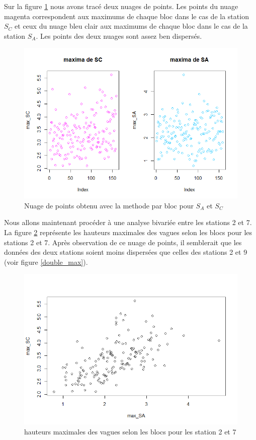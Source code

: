 \documentclass[a4paper,french,10pt]{article}
\begin{document}
Sur la figure \ref{max_SA_SC} nous avons tracé deux nuages de points. Les points du nuage magenta correspondent aux maximums de chaque bloc dans le cas de la station $S_C$ et ceux du nuage bleu clair aux maximums de chaque bloc dans le cas de la station $S_A$. Les points des deux nuages sont assez ben dispersés.
\begin{figure}[htp] 
	\centering
	\includegraphics[scale=0.45]{images/max_SA_SC.png}
	\caption{Nuage de points obtenu avec la methode par bloc pour $S_A$ et $S_C$}
	\label{max_SA_SC}
\end{figure}

Nous allons maintenant procéder à une analyse bivariée entre les stations 2 et 7. La figure \ref{double_max2} représente les hauteurs maximales des vagues selon les blocs pour les stations 2 et 7. Après observation de ce nuage de points, il semblerait que les données des deux stations soient moins dispersées que celles des stations 2 et 9 (voir figure \ref{double_max}).

\begin{figure}[htp] 
	\centering
	\includegraphics[scale=0.45]{images/double_max2.png}
	\caption{hauteurs maximales des vagues selon les blocs pour les station 2 et 7}
	\label{double_max2}
\end{figure}
\end{document}
